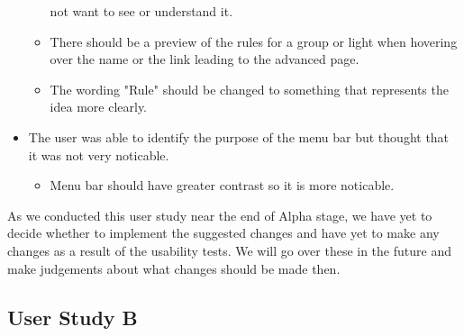 \documentclass[oneside,openright]{book}
\begin{document}
\begin{itemize}
\begin{itemize}
                not want to see or understand it.
            \item There should be a preview of the rules for a group or light
                when hovering over the name or the link leading to the advanced
                page.
            \item The wording "Rule" should be changed to something that
                represents the idea more clearly.
        \end{itemize}
    \item The user was able to identify the purpose of the menu bar but thought
        that it was not very noticable.
        \begin{itemize}
            \item Menu bar should have greater contrast so it is more
                noticable.
        \end{itemize}
\end{itemize}

As we conducted this user study near the end of Alpha stage, we have yet to
decide whether to implement the suggested changes and have yet to make any
changes as a result of the usability tests. We will go over these in the future
and make judgements about what changes should be made then.

\subsection{User Study B}
\end{document}
